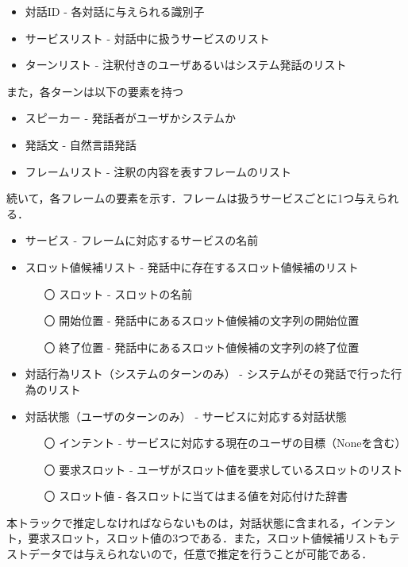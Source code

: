 \begin{itemize}
    \item 対話ID - 各対話に与えられる識別子
    \item サービスリスト - 対話中に扱うサービスのリスト
    \item ターンリスト - 注釈付きのユーザあるいはシステム発話のリスト
\end{itemize}
また，各ターンは以下の要素を持つ
\begin{itemize}
    \item スピーカー - 発話者がユーザかシステムか
    \item 発話文 - 自然言語発話
    \item フレームリスト - 注釈の内容を表すフレームのリスト
\end{itemize}
続いて，各フレームの要素を示す．フレームは扱うサービスごとに1つ与えられる．
\begin{itemize}
    \item サービス - フレームに対応するサービスの名前
    \item スロット値候補リスト - 発話中に存在するスロット値候補のリスト
    \begin{itemize}
        \item[〇] スロット - スロットの名前
        \item[〇] 開始位置 - 発話中にあるスロット値候補の文字列の開始位置
        \item[〇] 終了位置 - 発話中にあるスロット値候補の文字列の終了位置
    \end{itemize}
    \item 対話行為リスト（システムのターンのみ） - システムがその発話で行った行為のリスト
    \item 対話状態（ユーザのターンのみ） - サービスに対応する対話状態
    \begin{itemize}
        \item[〇] インテント - サービスに対応する現在のユーザの目標（Noneを含む）
        \item[〇] 要求スロット - ユーザがスロット値を要求しているスロットのリスト
        \item[〇] スロット値 - 各スロットに当てはまる値を対応付けた辞書
    \end{itemize}
\end{itemize}
\par
本トラックで推定しなければならないものは，対話状態に含まれる，インテント，要求スロット，スロット値の3つである．また，スロット値候補リストもテストデータでは与えられないので，任意で推定を行うことが可能である．